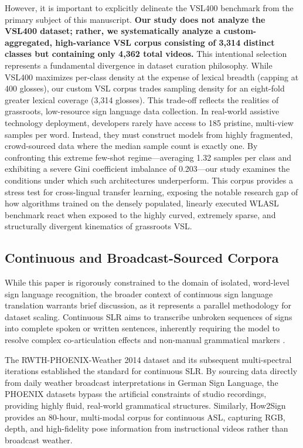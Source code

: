 \documentclass{ieeeaccess}
\begin{document}
However, it is important to explicitly delineate the VSL400 benchmark from the primary subject of this manuscript.
\textbf{Our study does not analyze the VSL400 dataset; rather, we systematically analyze a custom-aggregated, high-variance VSL corpus consisting of 3,314 distinct classes but containing only 4,362 total videos.} This intentional selection represents a fundamental divergence in dataset curation philosophy. While VSL400 maximizes per-class density at the expense of lexical breadth (capping at 400 glosses), our custom VSL corpus trades sampling density for an eight-fold greater lexical coverage (3,314 glosses).
This trade-off reflects the realities of grassroots, low-resource sign language data collection. In real-world assistive technology deployment, developers rarely have access to 185 pristine, multi-view samples per word. Instead, they must construct models from highly fragmented, crowd-sourced data where the median sample count is exactly one. By confronting this extreme few-shot regime—averaging 1.32 samples per class and exhibiting a severe Gini coefficient imbalance of 0.203—our study examines the conditions under which such architectures underperform. This corpus provides a stress test for cross-lingual transfer learning, exposing the notable research gap of how algorithms trained on the densely populated, linearly executed WLASL benchmark react when exposed to the highly curved, extremely sparse, and structurally divergent kinematics of grassroots VSL.

\subsection{Continuous and Broadcast-Sourced Corpora}
While this paper is rigorously constrained to the domain of isolated, word-level sign language recognition, the broader context of continuous sign language translation warrants brief discussion, as it represents a parallel methodology for dataset scaling. Continuous SLR aims to transcribe unbroken sequences of signs into complete spoken or written sentences, inherently requiring the model to resolve complex co-articulation effects and non-manual grammatical markers \cite{camgoz2018neural}.

The RWTH-PHOENIX-Weather 2014 dataset \cite{forster2012rwth} and its subsequent multi-spectral iterations \cite{koller2015continuous} established the standard for continuous SLR. By sourcing data directly from daily weather broadcast interpretations in German Sign Language, the PHOENIX datasets bypass the artificial constraints of studio recordings, providing highly fluid, real-world grammatical structures. Similarly, How2Sign \cite{duarte2021how2sign} provides an 80-hour, multi-modal corpus for continuous ASL, capturing RGB, depth, and high-fidelity pose information from instructional videos rather than broadcast weather.
\end{document}
